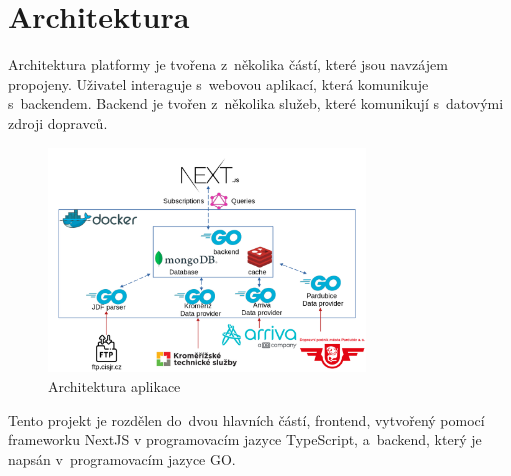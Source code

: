 \section{Architektura}
Architektura platformy je tvořena z~několika částí, které jsou navzájem propojeny. Uživatel interaguje s~webovou aplikací, která komunikuje s~backendem. Backend je tvořen z~několika služeb, které komunikují s~datovými zdroji dopravců.
\begin{figure}[H]
    \centering
    \includegraphics[width=0.75\textwidth]{images/architekturaV5.png}
    \caption{Architektura aplikace}
    \label{architektura}
\end{figure}
\newpage
Tento projekt je rozdělen do~dvou hlavních částí, frontend, vytvořený pomocí frameworku NextJS v programovacím jazyce TypeScript, a~backend, který je napsán v~programovacím jazyce GO.
